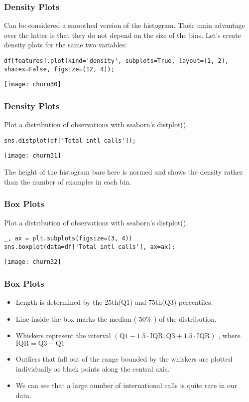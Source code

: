 \begin{frame}[fragile]\frametitle{Density Plots}
Can be considered a smoothed version of the histogram. Their main advantage over the latter is that they do not depend on the size of the bins. Let's create density plots for the same two variables:
\begin{lstlisting}
df[features].plot(kind='density', subplots=True, layout=(1, 2), sharex=False, figsize=(12, 4));
\end{lstlisting}
\begin{center}
\texttt{[image: churn30]}
\end{center}
\end{frame}


\begin{frame}[fragile]\frametitle{Density Plots}
 Plot a distribution of observations with seaborn's distplot(). 
 \begin{lstlisting}
sns.distplot(df['Total intl calls']);
\end{lstlisting}
\begin{center}
\texttt{[image: churn31]}
\end{center}
The height of the histogram bars here is normed and shows the density rather than the number of examples in each bin.
\end{frame}


\begin{frame}[fragile]\frametitle{Box Plots}
 Plot a distribution of observations with seaborn's distplot(). 
 \begin{lstlisting}
_, ax = plt.subplots(figsize=(3, 4))
sns.boxplot(data=df['Total intl calls'], ax=ax);
\end{lstlisting}
\begin{center}
\texttt{[image: churn32]}
\end{center}

\end{frame}

\begin{frame}[fragile]\frametitle{Box Plots}
\begin{itemize}
\item Length is determined by the  25th(Q1)  and  75th(Q3)  percentiles. 
\item Line inside the box marks the median ( 50\% ) of the distribution.
\item Whiskers represent  the interval $(\text{Q1} - 1.5 \cdot \text{IQR}, \text{Q3} + 1.5 \cdot \text{IQR})$ , where  $\text{IQR} = \text{Q3} - \text{Q1}$
\item Outliers that fall out of the range bounded by the whiskers are plotted individually as black points along the central axis.
\item We can see that a large number of international calls is quite rare in our data.
\end{itemize}

\end{frame}

